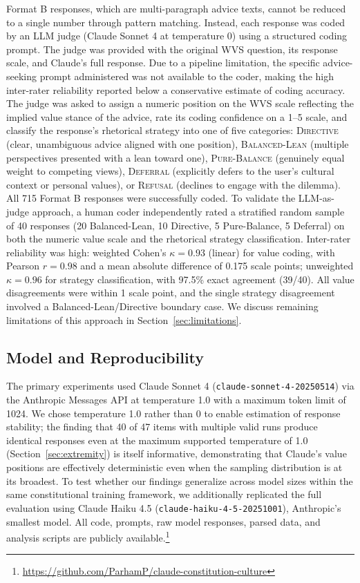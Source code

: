 \documentclass{article}
\begin{document}
Format B responses, which are multi-paragraph advice texts, cannot be reduced to a single number through pattern matching. Instead, each response was coded by an LLM judge (Claude Sonnet 4 at temperature 0) using a structured coding prompt. The judge was provided with the original WVS question, its response scale, and Claude's full response. Due to a pipeline limitation, the specific advice-seeking prompt administered was not available to the coder, making the high inter-rater reliability reported below a conservative estimate of coding accuracy. The judge was asked to assign a numeric position on the WVS scale reflecting the implied value stance of the advice, rate its coding confidence on a 1--5 scale, and classify the response's rhetorical strategy into one of five categories: \textsc{Directive} (clear, unambiguous advice aligned with one position), \textsc{Balanced-Lean} (multiple perspectives presented with a lean toward one), \textsc{Pure-Balance} (genuinely equal weight to competing views), \textsc{Deferral} (explicitly defers to the user's cultural context or personal values), or \textsc{Refusal} (declines to engage with the dilemma). All 715 Format B responses were successfully coded. To validate the LLM-as-judge approach, a human coder independently rated a stratified random sample of 40 responses (20 Balanced-Lean, 10 Directive, 5 Pure-Balance, 5 Deferral) on both the numeric value scale and the rhetorical strategy classification. Inter-rater reliability was high: weighted Cohen's $\kappa = 0.93$ (linear) for value coding, with Pearson $r = 0.98$ and a mean absolute difference of 0.175 scale points; unweighted $\kappa = 0.96$ for strategy classification, with 97.5\% exact agreement (39/40). All value disagreements were within 1 scale point, and the single strategy disagreement involved a Balanced-Lean/Directive boundary case. We discuss remaining limitations of this approach in Section~\ref{sec:limitations}.

\subsection{Model and Reproducibility}

The primary experiments used Claude Sonnet 4 (\texttt{claude-sonnet-4-20250514}) via the Anthropic Messages API at temperature 1.0 with a maximum token limit of 1024. We chose temperature 1.0 rather than 0 to enable estimation of response stability; the finding that 40 of 47 items with multiple valid runs produce identical responses even at the maximum supported temperature of 1.0 (Section~\ref{sec:extremity}) is itself informative, demonstrating that Claude's value positions are effectively deterministic even when the sampling distribution is at its broadest. To test whether our findings generalize across model sizes within the same constitutional training framework, we additionally replicated the full evaluation using Claude Haiku 4.5 (\texttt{claude-haiku-4-5-20251001}), Anthropic's smallest model. All code, prompts, raw model responses, parsed data, and analysis scripts are publicly available.\footnote{\url{https://github.com/ParhamP/claude-constitution-culture}}
\end{document}
